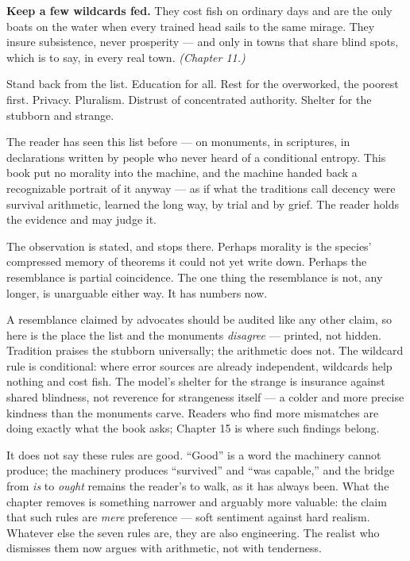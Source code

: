 \textbf{Keep a few wildcards fed.} They cost fish on ordinary days and are
the only boats on the water when every trained head sails to the same
mirage. They insure subsistence, never prosperity --- and only in towns
that share blind spots, which is to say, in every real town.
\emph{(Chapter 11.)}


Stand back from the list. Education for all. Rest for the overworked,
the poorest first. Privacy. Pluralism. Distrust of concentrated
authority. Shelter for the stubborn and strange.

The reader has seen this list before --- on monuments, in scriptures,
in declarations written by people who never heard of a conditional
entropy. This book put no morality into the machine, and the machine
handed back a recognizable portrait of it anyway --- as if what the
traditions call decency were survival arithmetic, learned the long way,
by trial and by grief. The reader holds the evidence and may judge it.

The observation is stated, and stops there. Perhaps morality is the
species' compressed memory of theorems it could not yet write down.
Perhaps the resemblance is partial coincidence. The one thing the
resemblance is not, any longer, is unarguable either way. It has
numbers now.


A resemblance claimed by advocates should be audited like any other
claim, so here is the place the list and the monuments \emph{disagree} ---
printed, not hidden. Tradition praises the stubborn universally; the
arithmetic does not. The wildcard rule is conditional: where error
sources are already independent, wildcards help nothing and cost
fish. The model's shelter for the strange is insurance against shared
blindness, not reverence for strangeness itself --- a colder and more
precise kindness than the monuments carve. Readers who find more
mismatches are doing exactly what the book asks; Chapter 15 is where
such findings belong.


It does not say these rules are good. ``Good'' is a word the machinery
cannot produce; the machinery produces ``survived'' and ``was capable,''
and the bridge from \emph{is} to \emph{ought} remains the reader's to walk, as
it has always been. What the chapter removes is something narrower
and arguably more valuable: the claim that such rules are \emph{mere}
preference --- soft sentiment against hard realism. Whatever else the
seven rules are, they are also engineering. The realist who dismisses
them now argues with arithmetic, not with tenderness.

